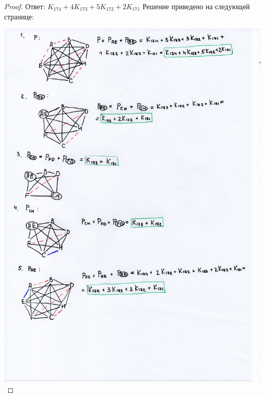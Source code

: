 \begin{proof}

    Ответ: $K_{174}+4K_{173}+5K_{172}+2K_{171}$ Решение приведено на следующей странице:
    
    \centering\includegraphics[width=1\linewidth]{pics/12thSolution.jpg}


\end{proof}
